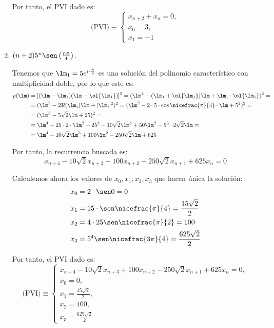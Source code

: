 \begin{ejercicio}
\begin{enumerate}
        Por tanto, el PVI dado es:
        \begin{equation*}
            \text{(PVI)}\equiv \left\{ \begin{array}{l}
                x_{n+2}+x_n=0,\\
                x_0=3,\\
                x_1=-1
            \end{array}\right.
        \end{equation*}
        
        \item $(n+2)5^n\sen\left(\frac{n\pi}{4}\right)$.

        Tenemos que $\lm_1=5e^{i\cdot \frac{\pi}{4}}$ es una solución del polinomio característico con multiplicidad doble, por lo que este es:
        \begin{align*}
            p(\lm) &= [(\lm-\lm_1)(\lm-\ol{\lm_1})]^2 = (\lm^2-(\lm_1+\ol{\lm_1})\lm + \lm_1\cdot \ol{\lm_1})^2 =\\
            &= (\lm^2-2\Re(\lm_i)\lm + |\lm_i|^2)^2
            = (\lm^2-2\cdot 5\cdot \cos \nicefrac{\pi}{4}\cdot \lm + 5^2)^2 =\\
            &= (\lm^2-5\sqrt{2}\lm + 25)^2 =\\
            &=\lm^4 + 25\cdot 2\cdot \lm^2 + 25^2 -10\sqrt{2}\lm^3 +50\lm^2 -5^3\cdot 2\sqrt{2}\lm =\\
            &= \lm^4 -10\sqrt{2}\lm^3 +100\lm^2-250\sqrt{2} \lm +625
        \end{align*}

        Por tanto, la recurrencia buscada es:
        \begin{equation*}
            x_{n+4} -10\sqrt{2}x_{n+3} +100x_{n+2}-250\sqrt{2}x_{n+1} +625x_n=0
        \end{equation*}
        
        Calculemos ahora los valores de $x_0,x_1,x_2,x_3$ que hacen única la solución:
        \begin{align*}
            x_0 &= 2\cdot \sen 0 = 0 \\
            x_1 &= 15\cdot \sen \nicefrac{\pi}{4} = \frac{15\sqrt{2}}{2}\\
            x_2 &= 4\cdot 25 \sen \nicefrac{\pi}{2} = 100\\
            x_3 &= 5^4\sen \nicefrac{3\pi}{4} = \frac{625\sqrt{2}}{2}
        \end{align*}

        Por tanto, el PVI dado es:
        \begin{equation*}
            \text{(PVI)}\equiv \left\{ \begin{array}{l}
                x_{n+4} -10\sqrt{2}x_{n+3} +100x_{n+2}-250\sqrt{2}x_{n+1} +625x_n=0,\\
                x_0=0,\\
                x_1=\frac{15\sqrt{2}}{2},\\
                x_2=100,\\
                x_3=\frac{625\sqrt{2}}{2}
            \end{array}\right.
        \end{equation*}
        

\end{enumerate}
\end{ejercicio}
